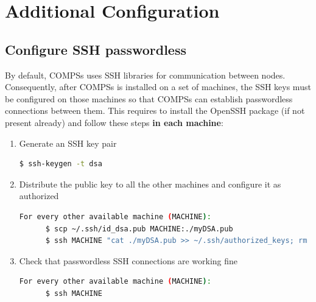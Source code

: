 \section{Additional Configuration}
\label{sec:Additional_Configuration}


\subsection{Configure SSH passwordless}
By default, COMPSs uses SSH libraries for communication between nodes. Consequently, after COMPSs is installed on a set of machines,
the SSH keys must be configured on those machines so that COMPSs can establish passwordless connections between them. This requires
to install the OpenSSH package (if not present already) and follow these steps \textbf{in each machine}:
\begin{enumerate}
 \item Generate an SSH key pair
       \begin{lstlisting}[language=bash]
	  $ ssh-keygen -t dsa
       \end{lstlisting}
 \item Distribute the public key to all the other machines and configure it as authorized
       \begin{lstlisting}[language=bash]
          For every other available machine (MACHINE):
	  $ scp ~/.ssh/id_dsa.pub MACHINE:./myDSA.pub
	  $ ssh MACHINE "cat ./myDSA.pub >> ~/.ssh/authorized_keys; rm ./myDSA.pub"
       \end{lstlisting}
 \item Check that passwordless SSH connections are working fine
       \begin{lstlisting}[language=bash]
          For every other available machine (MACHINE):
	  $ ssh MACHINE
       \end{lstlisting}
\end{enumerate}

